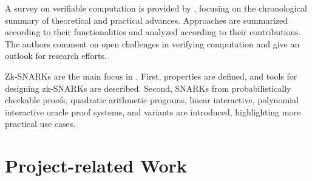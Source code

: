 A survey on verifiable computation is provided by \citet{Ahmad}, focusing on the chronological summary of theoretical and practical advances. Approaches are summarized according to their functionalities and analyzed according to their contributions. The authors comment on open challenges in verifying computation and give an outlook for research efforts. 

Zk-SNARKs are the main focus in \citet{NitulescuGentleIntroSNARKs}. First, properties are defined, and tools for designing zk-SNARKs are described. Second, SNARKs from probabilistically checkable proofs, quadratic arithmetic programs, linear interactive, polynomial interactive oracle proof systems, and variants are introduced, highlighting more practical use cases. 

\section{Project-related Work}

